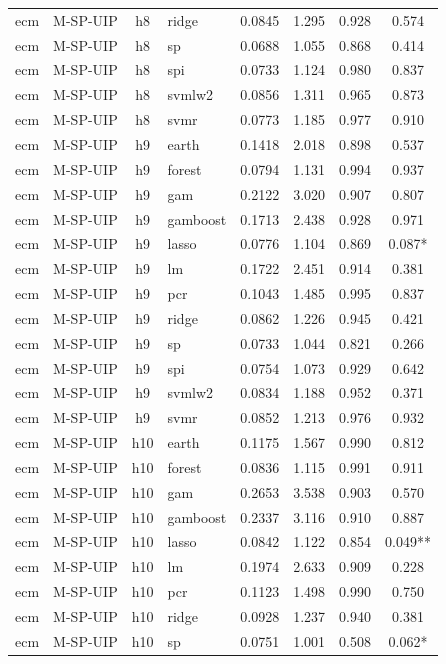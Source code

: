 \begin{ThreePartTable}
\begin{longtable}[t]{llclcccc}
ecm & M-SP-UIP & h8 & ridge & 0.0845 & 1.295 & 0.928 & 0.574\\
ecm & M-SP-UIP & h8 & sp & 0.0688 & 1.055 & 0.868 & 0.414\\
ecm & M-SP-UIP & h8 & spi & 0.0733 & 1.124 & 0.980 & 0.837\\
ecm & M-SP-UIP & h8 & svmlw2 & 0.0856 & 1.311 & 0.965 & 0.873\\
ecm & M-SP-UIP & h8 & svmr & 0.0773 & 1.185 & 0.977 & 0.910\\
\addlinespace
ecm & M-SP-UIP & h9 & earth & 0.1418 & 2.018 & 0.898 & 0.537\\
ecm & M-SP-UIP & h9 & forest & 0.0794 & 1.131 & 0.994 & 0.937\\
ecm & M-SP-UIP & h9 & gam & 0.2122 & 3.020 & 0.907 & 0.807\\
ecm & M-SP-UIP & h9 & gamboost & 0.1713 & 2.438 & 0.928 & 0.971\\
ecm & M-SP-UIP & h9 & lasso & 0.0776 & 1.104 & 0.869 & 0.087*\\
ecm & M-SP-UIP & h9 & lm & 0.1722 & 2.451 & 0.914 & 0.381\\
ecm & M-SP-UIP & h9 & pcr & 0.1043 & 1.485 & 0.995 & 0.837\\
ecm & M-SP-UIP & h9 & ridge & 0.0862 & 1.226 & 0.945 & 0.421\\
ecm & M-SP-UIP & h9 & sp & 0.0733 & 1.044 & 0.821 & 0.266\\
ecm & M-SP-UIP & h9 & spi & 0.0754 & 1.073 & 0.929 & 0.642\\
ecm & M-SP-UIP & h9 & svmlw2 & 0.0834 & 1.188 & 0.952 & 0.371\\
ecm & M-SP-UIP & h9 & svmr & 0.0852 & 1.213 & 0.976 & 0.932\\
\addlinespace
ecm & M-SP-UIP & h10 & earth & 0.1175 & 1.567 & 0.990 & 0.812\\
ecm & M-SP-UIP & h10 & forest & 0.0836 & 1.115 & 0.991 & 0.911\\
ecm & M-SP-UIP & h10 & gam & 0.2653 & 3.538 & 0.903 & 0.570\\
ecm & M-SP-UIP & h10 & gamboost & 0.2337 & 3.116 & 0.910 & 0.887\\
ecm & M-SP-UIP & h10 & lasso & 0.0842 & 1.122 & 0.854 & 0.049**\\
ecm & M-SP-UIP & h10 & lm & 0.1974 & 2.633 & 0.909 & 0.228\\
ecm & M-SP-UIP & h10 & pcr & 0.1123 & 1.498 & 0.990 & 0.750\\
ecm & M-SP-UIP & h10 & ridge & 0.0928 & 1.237 & 0.940 & 0.381\\
ecm & M-SP-UIP & h10 & sp & 0.0751 & 1.001 & 0.508 & 0.062*\\

\end{longtable}
\end{ThreePartTable}
